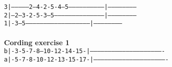 \documentclass[12pt]{extarticle}
\def\code#1{\texttt{#1}}
\begin{document}
\code{3|---------------2---4-2-5-4---5-----------------------------|------------------------}\\
\code{2|---2---3-2-5-3---5-----------------------------------------|------------------------}\\
\code{1|-3---5-----------------------------------------------------|------------------------}\\\\
\textbf{Cording exercise 1}\\
\code{b|-3-5-7-8--10-12-14-15-|-------------------------------------------------------------}\\
\code{a|-5-7-8-10-12-13-15-17-|-------------------------------------------------------------}\\\\
\end{document}
